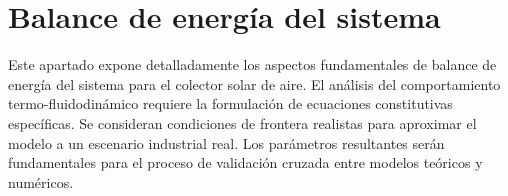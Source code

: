 \section{Balance de energía del sistema}
\label{sec:cap06_balance}

Este apartado expone detalladamente los aspectos fundamentales de balance de energía del sistema para el colector solar de aire.
El análisis del comportamiento termo-fluidodinámico requiere la formulación de ecuaciones constitutivas específicas.
Se consideran condiciones de frontera realistas para aproximar el modelo a un escenario industrial real.
Los parámetros resultantes serán fundamentales para el proceso de validación cruzada entre modelos teóricos y numéricos.

